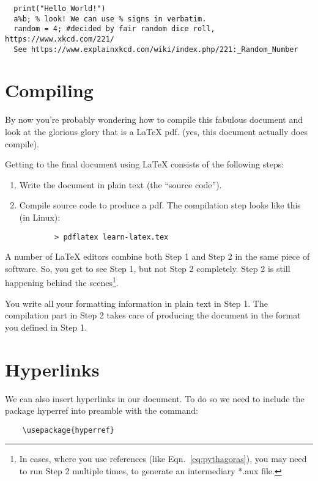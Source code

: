 \documentclass[12pt]{article}
\begin{document}
\begin{verbatim}
  print("Hello World!")
  a%b; % look! We can use % signs in verbatim.
  random = 4; #decided by fair random dice roll, https://www.xkcd.com/221/
  See https://www.explainxkcd.com/wiki/index.php/221:_Random_Number
\end{verbatim}

\section{Compiling}

By now you're probably wondering how to compile this fabulous document
and look at the glorious glory that is a \LaTeX{} pdf.
(yes, this document actually does compile).

Getting to the final document using \LaTeX{} consists of the following
steps:
  \begin{enumerate}
    \item Write the document in plain text (the ``source code'').
    \item Compile source code to produce a pdf.
     The compilation step looks like this (in Linux): \\
     \begin{verbatim}
        > pdflatex learn-latex.tex
     \end{verbatim}
  \end{enumerate}

A number of \LaTeX{} editors combine both Step 1 and Step 2 in the
same piece of software. So, you get to see Step 1, but not Step 2 completely.
Step 2 is still happening behind the scenes\footnote{In cases, where you use
references (like Eqn.~\ref{eq:pythagoras}), you may need to run Step 2
multiple times, to generate an intermediary *.aux file.}.

You write all your formatting information in plain text in Step 1.
The compilation part in Step 2 takes care of producing the document in the
format you defined in Step 1.

\section{Hyperlinks}
We can also insert hyperlinks in our document. To do so we need to include the
package hyperref into preamble with the command:
\begin{verbatim}
    \usepackage{hyperref}
\end{verbatim}
\end{document}
